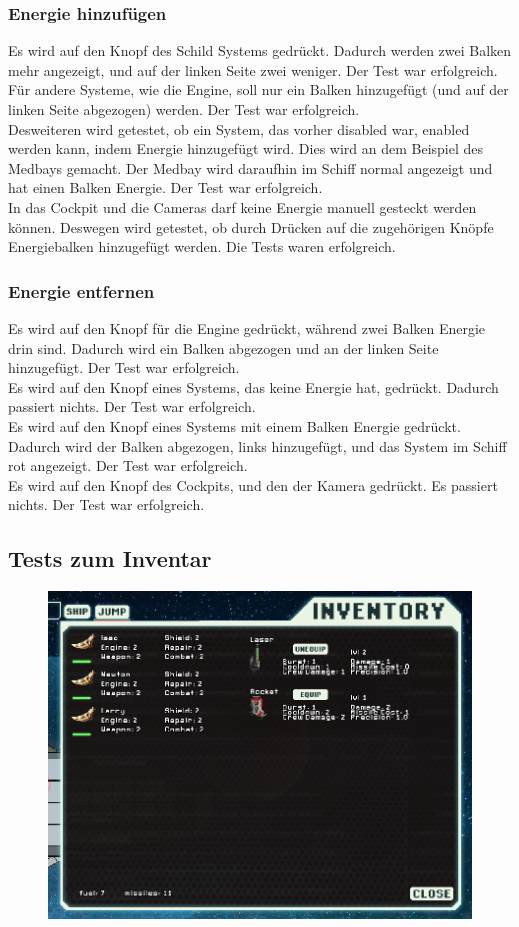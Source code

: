\documentclass[fontsize=12pt,paper=a4,twoside]{scrartcl}
\begin{document}
\subsubsection{Energie hinzufügen}
Es wird auf den Knopf des Schild Systems gedrückt. Dadurch werden zwei Balken mehr angezeigt, und auf der linken Seite zwei weniger. Der Test war erfolgreich. \\
Für andere Systeme, wie die Engine, soll nur ein Balken hinzugefügt (und auf der linken Seite abgezogen) werden. Der Test war erfolgreich. \\
Desweiteren wird getestet, ob ein System, das vorher disabled war, enabled werden kann, indem Energie hinzugefügt wird. Dies wird an dem Beispiel des Medbays gemacht. Der Medbay wird daraufhin im Schiff normal angezeigt und hat einen Balken Energie. Der Test war erfolgreich. \\
In das Cockpit und die Cameras darf keine Energie manuell gesteckt werden können. Deswegen wird getestet, ob durch Drücken auf die zugehörigen Knöpfe Energiebalken hinzugefügt werden. Die Tests waren erfolgreich. \\
\subsubsection{Energie entfernen}
Es wird auf den Knopf für die Engine gedrückt, während zwei Balken Energie drin sind. Dadurch wird ein Balken abgezogen und an der linken Seite hinzugefügt. Der Test war erfolgreich. \\
Es wird auf den Knopf eines Systems, das keine Energie hat, gedrückt. Dadurch passiert nichts. Der Test war erfolgreich. \\
Es wird auf den Knopf eines Systems mit einem Balken Energie gedrückt. Dadurch wird der Balken abgezogen, links hinzugefügt, und das System im Schiff rot angezeigt. Der Test war erfolgreich. \\
Es wird auf den Knopf des Cockpits, und  den der Kamera gedrückt. Es passiert nichts. Der Test war erfolgreich.  \\



\subsection{Tests zum Inventar}
\begin{figure}[h!]
\centering
\includegraphics[width=0.5\linewidth]{images/inventory1.png}
\end{figure}
\end{document}
